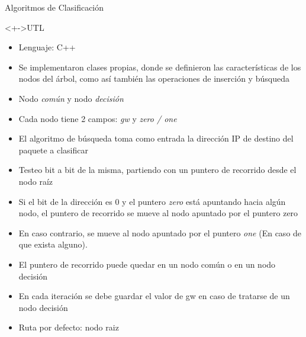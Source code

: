 \documentclass[xcolor=dvipsnames]{beamer}
\begin{document}
\begin{frame}{Algoritmos de Clasificación}
\begin{block}<+->{UTL}   
    \begin{itemize}
      \scriptsize
     	
     	\item Lenguaje: C++
     	\item Se implementaron clases propias, donde se definieron las características de los nodos del árbol, como así también las operaciones de inserción y búsqueda
     	\item Nodo \emph{común} y nodo \emph{decisión}
	\item Cada nodo tiene 2 campos: \emph{gw} y \emph{zero / one}
	\item El algoritmo de búsqueda toma como entrada la dirección IP de destino del paquete a clasificar
	\item Testeo bit a bit de la misma, partiendo con un puntero de recorrido desde el nodo raíz
	\item Si el bit de la dirección es 0 y el puntero \emph{zero} está apuntando hacia algún nodo, el puntero de recorrido se mueve al nodo apuntado por el puntero zero
	\item En caso contrario, se mueve al nodo apuntado por el puntero \emph{one} (En caso de que exista alguno).
	\item El puntero de recorrido puede quedar en un nodo común o en un nodo decisión
	\item En cada iteración se debe guardar el valor de gw en caso de tratarse de un nodo decisión
	\item Ruta por defecto: nodo raiz
    \end{itemize}
  \end{block}
\end{frame}
\end{document}
